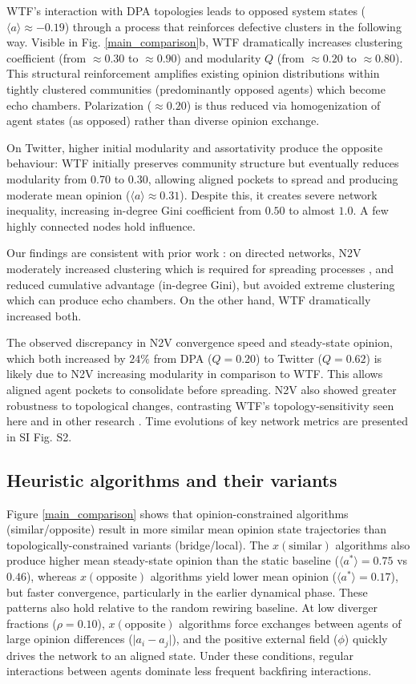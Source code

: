 \documentclass[unnumsec,webpdf,contemporary,large]{oup-authoring-template}%
\theoremstyle{thmstyleone}%
\theoremstyle{thmstyletwo}%
\theoremstyle{thmstylethree}%
\begin{document}
WTF's interaction with DPA topologies leads to opposed system states ($\langle a \rangle \approx -0.19$) through a process that reinforces defective clusters in the following way. Visible in Fig. \ref{main_comparison}b, WTF dramatically increases clustering coefficient (from $\approx 0.30$ to $\approx 0.90$) and modularity $Q$ (from $\approx 0.20$ to $\approx 0.80$). This structural reinforcement amplifies existing opinion distributions within tightly clustered communities (predominantly opposed agents) which become echo chambers. Polarization ($\approx 0.20$) is thus reduced via homogenization of agent states (as opposed) rather than diverse opinion exchange.

On Twitter, higher initial modularity and assortativity produce the opposite behaviour: WTF initially preserves community structure but eventually reduces modularity from 0.70 to 0.30, allowing aligned pockets to spread and producing moderate mean opinion ($\langle  a \rangle  \approx0.31$). Despite this, it creates severe network inequality, increasing in-degree Gini coefficient from $0.50$ to almost $1.0$. A few highly connected nodes hold influence.

Our findings are consistent with prior work \cite{ferrara_link_2022}: on directed networks, N2V moderately increased clustering which is required for spreading processes \citep{everall_pareto_2025}, and reduced cumulative advantage (in-degree Gini), but avoided extreme clustering which can produce echo chambers. On the other hand, WTF dramatically increased both.

The observed discrepancy in N2V convergence speed and steady-state opinion, which both increased by $24\%$ from DPA ($Q=0.20$) to Twitter ($Q=0.62$) is likely due to N2V increasing modularity in comparison to WTF. This allows aligned agent pockets to consolidate before spreading. N2V also showed greater robustness to topological changes, contrasting WTF's topology-sensitivity seen here and in other research \cite{espin-noboa_inequality_2022}. Time evolutions of key network metrics are presented in SI Fig. S2.


\subsection{Heuristic algorithms and their variants}\label{sec:heuristic}
Figure \ref{main_comparison} shows that opinion-constrained algorithms (similar/opposite) result in more similar mean opinion state trajectories than topologically-constrained variants (bridge/local). The $x(\text{similar})$ algorithms also produce higher mean steady-state opinion than the static baseline ($\langle a^* \rangle  = 0.75$ vs $0.46$), whereas $x(\text{opposite})$ algorithms yield lower mean opinion ($\langle a^* \rangle = 0.17$), but faster convergence, particularly in the earlier dynamical phase. These patterns also hold relative to the random rewiring baseline. At low diverger fractions ($\rho = 0.10$),  $x(\text{opposite})$ algorithms force exchanges between agents of large opinion differences ($\lvert a_i - a_j \rvert$), and the positive external field ($\phi$) quickly drives the network to an aligned state. Under these conditions, regular interactions between agents dominate less frequent backfiring interactions.
\end{document}
